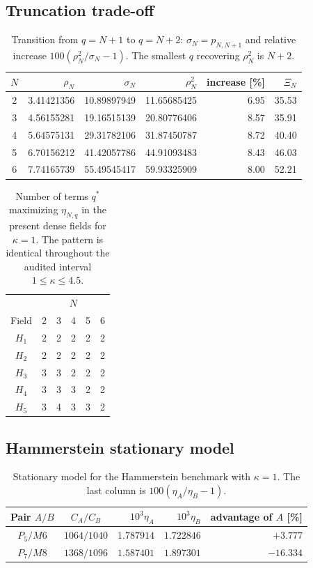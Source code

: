 \documentclass[11pt]{article}
\begin{document}
\subsection{Truncation trade-off}
\begin{table}[htbp]
\centering\small
\caption{Transition from $q=N+1$ to $q=N+2$: $\sigma_N=p_{N,N+1}$ and relative increase $100(\rho_N^2/\sigma_N-1)$. The smallest $q$ recovering $\rho_N^2$ is $N+2$.}\label{tab:q-transition}
\begin{tabular}{crrrrr}
\toprule
$N$ & $\rho_N$ & $\sigma_N$ & $\rho_N^2$ & increase [\%] & $\Xi_N$\\\midrule
2&3.41421356&10.89897949&11.65685425&6.95&35.53\\
3&4.56155281&19.16515139&20.80776406&8.57&35.91\\
4&5.64575131&29.31782106&31.87450787&8.72&40.40\\
5&6.70156212&41.42057786&44.91093483&8.43&46.03\\
6&7.74165739&55.49545417&59.93325909&8.00&52.21\\
\bottomrule\end{tabular}
\end{table}
\begin{table}[ht]
\centering
\caption{Number of terms $q^*$ maximizing $\eta_{N,q}$ in the present dense fields for $\kappa=1$. The pattern is identical throughout the audited interval $1\leq\kappa\leq4.5$.}\label{tab:qstar-fields}
\begin{tabular}{c|ccccc}
\toprule
&\multicolumn{5}{c}{$N$}\\
Field&2&3&4&5&6\\
\midrule
$H_1$&2&2&2&2&2\\
$H_2$&2&2&2&2&2\\
$H_3$&3&3&2&2&2\\
$H_4$&3&3&3&2&2\\
$H_5$&3&4&3&3&2\\
\bottomrule
\end{tabular}
\end{table}
\FloatBarrier
\subsection{Hammerstein stationary model}
\begin{table}[htbp]
\centering
\small
\caption{Stationary model for the Hammerstein benchmark with $\kappa=1$. The last column is $100(\eta_A/\eta_B-1)$.}
\label{tab:hammerstein-stationary}
\begin{tabular}{ccrrr}
\toprule
Pair $A/B$ & $C_A/C_B$ & $10^3\eta_A$ & $10^3\eta_B$ & advantage of $A$ [\%]\\
\midrule
$P_5/M6$ & $1064/1040$ & $1.787914$ & $1.722846$ & $+3.777$\\
$P_7/M8$ & $1368/1096$ & $1.587401$ & $1.897301$ & $-16.334$\\
\bottomrule
\end{tabular}
\end{table}
\FloatBarrier
\clearpage
\end{document}
